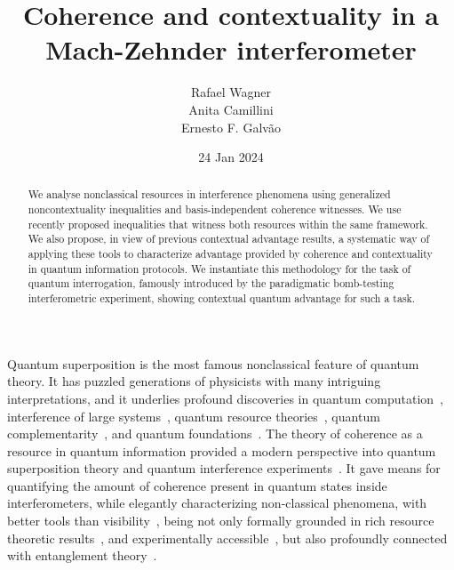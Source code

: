 \documentclass[letterpaper,onecolumn,12pt,accepted=2024-01-17]{article}
\begin{document}
\title{Coherence and contextuality in a Mach-Zehnder interferometer }
\author{Rafael Wagner\\ Anita Camillini \\ Ernesto F. Galvão}
\date{24 Jan 2024}
\maketitle

\begin{abstract}
      We analyse nonclassical resources in interference phenomena using generalized noncontextuality inequalities and basis-independent coherence witnesses. We use recently proposed inequalities that witness both resources within the same framework. We also propose, in view of previous contextual advantage results, a systematic way of applying these tools to characterize advantage provided by coherence and contextuality in quantum information protocols. We instantiate this methodology for the task of quantum interrogation, famously introduced by the paradigmatic bomb-testing interferometric experiment, showing contextual quantum advantage for such a task. 
\end{abstract}

\newpage

Quantum superposition is the most famous nonclassical feature of quantum theory. It has puzzled generations of physicists with many intriguing interpretations, and it underlies profound discoveries in quantum computation~\cite{shor1999polynomial,parker2000efficient,ahnefeld2022role}, interference of large systems~\cite{nairz2003quantum}, quantum resource theories~\cite{Chitambar19}, quantum complementarity~\cite{bohr1928quantum,wootters1979complementarity,englert1996fringe,cheng2015complementarity,basso2021complete}, and quantum foundations~\cite{elitzur1993quantum,hardy1992existence}. The theory of coherence as a resource in quantum information provided a modern perspective into quantum superposition theory and quantum interference experiments~\cite{baumgratz2014quantifying,Streltsov17}. It gave means for quantifying the amount of coherence present in quantum states inside interferometers, while elegantly characterizing non-classical phenomena{, with better tools} than visibility~\cite{chrysosthemos_quantum_2022,mishra2019decoherence,qureshi2019coherence}, being not only formally grounded in rich resource theoretic results~\cite{biswas_interferometric_2017,paul2017measuring},  and experimentally accessible~\cite{wu2021experimental}, but also profoundly connected with entanglement theory~\cite{streltsov2015measuring,streltsov2016entanglement,qiao2018entanglement}. 
\end{document}
